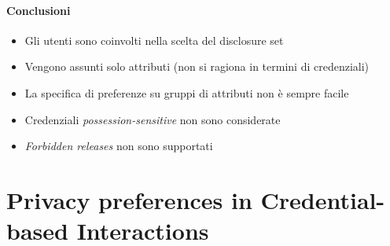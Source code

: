 \documentclass{report}
\begin{document}
\subsubsection{Conclusioni}
\begin{itemize}
    \item Gli utenti sono coinvolti nella scelta del disclosure set
    \item Vengono assunti solo attributi (non si ragiona in termini di credenziali)
    \item La specifica di preferenze su gruppi di attributi non è sempre facile
    \item Credenziali \textit{possession-sensitive} non sono considerate
    \item \textit{Forbidden releases} non sono supportati
\end{itemize}

\chapter{Privacy preferences in Credential-based Interactions}
\end{document}
